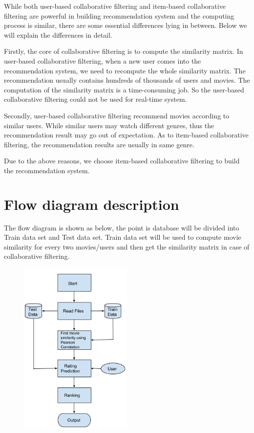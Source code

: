 \documentclass[two column]{article}
\begin{document}
\par While both user-based collaborative filtering and item-based collaborative filtering are powerful in building recommendation system and the computing process is similar, there are some essential differences lying in between. Below we will explain the differences in detail.

\par Firstly, the core of collaborative filtering is to compute the similarity matrix. In user-based collaborative filtering, when a new user comes into the recommendation system, we need to recompute the whole similarity matrix. The recommendation usually contains hundreds of thousands of users and movies. The computation of the similarity matrix is a time-consuming job. So the user-based collaborative filtering could not be used for real-time system.

\par Secondly, user-based collaborative filtering recommend movies according to similar users. While similar users may watch different genres, thus the recommendation result may go out of expectation. As to item-based collaborative filtering, the recommendation results are usually in same genre.

\par Due to the above reasons, we choose item-based collaborative filtering to build the recommendation system.

\section{Flow diagram description}
\par The flow diagram is shown as below, the point is database will be divided into Train data set and Test data set. Train data set will be used to compute movie similarity for every two movies/users and then get the similarity matrix in case of collaborative filtering.

\begin{figure}[H]
\centering
\includegraphics[width=0.5\textwidth]{Flow-chart.png}
\end{figure}
\end{document}
